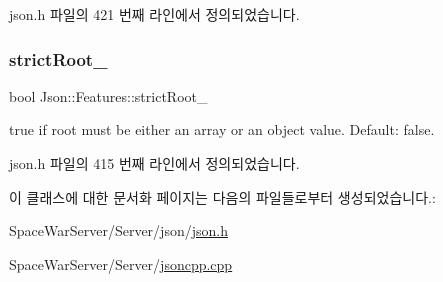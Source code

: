 json.\+h 파일의 421 번째 라인에서 정의되었습니다.

\mbox{\label{class_json_1_1_features_a1162c37a1458adc32582b585b552f9c3}} 
\subsubsection{\texorpdfstring{strict\+Root\+\_\+}{strictRoot\_}}
{\footnotesize\ttfamily bool Json\+::\+Features\+::strict\+Root\+\_\+}

{\ttfamily true} if root must be either an array or an object value. Default\+: {\ttfamily false}. 

json.\+h 파일의 415 번째 라인에서 정의되었습니다.



이 클래스에 대한 문서화 페이지는 다음의 파일들로부터 생성되었습니다.\+:\begin{DoxyCompactItemize}
\item 
Space\+War\+Server/\+Server/json/\hyperlink{json_8h}{json.\+h}\item 
Space\+War\+Server/\+Server/\hyperlink{jsoncpp_8cpp}{jsoncpp.\+cpp}\end{DoxyCompactItemize}
